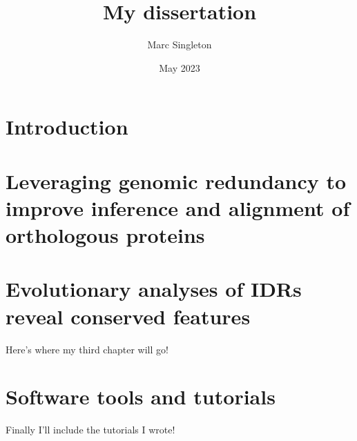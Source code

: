 \documentclass[11pt,letterpaper,oneside]{book}
\begin{document}
\title{My dissertation}
\author{Marc Singleton}
\date{May 2023}
\maketitle

\tableofcontents

\chapter{Introduction}
\graphicspath{{introduction/figures/}}


\chapter{Leveraging genomic redundancy to improve inference and alignment of orthologous proteins}
\graphicspath{{chapter1/figures/}}

\clearpage
\setcounter{figure}{0}
\renewcommand{\thefigure}{S\arabic{figure}}

\renewcommand{\thefigure}{\arabic{chapter}.\arabic{figure}}

\chapter{Evolutionary analyses of IDRs reveal conserved features}
Here's where my third chapter will go!

\lipsum[6-8]

\chapter{Software tools and tutorials}
Finally I'll include the tutorials I wrote!

\lipsum[9-10]

\printbibliography[heading=bibintoc]
\end{document}
